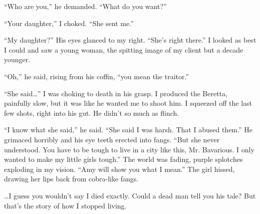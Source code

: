 ``Who are you,'' he demanded. ``What do you
want?''



``Your daughter,'' I choked. ``She sent
me.''



``My daughter?'' His eyes glanced to my right.
``She's right there.'' I looked as best I could and
saw a young woman, the spitting image of my client but a decade
younger.



``Oh,'' he said, rising from his coffin, ``you mean
the traitor.''



``She said{\ldots}'' I was choking to death in his grasp.
I produced the Beretta, painfully slow, but it was like he wanted
me to shoot him. I squeezed off the last few shots, right into his
gut. He didn't so much as flinch.



``I know what she said,'' he said. ``She said I was
harsh. That I abused them.'' He grimaced horribly and his eye
teeth erected into fangs. ``But she never understood. You have
to be tough to live in a city like this, Mr. Bavarious. I only
wanted to make my little girls tough.'' The world was fading,
purple splotches exploding in my vision. ``Amy will show you
what I mean.'' The girl hissed, drawing her lips back from
cobra-like fangs.



{\ldots}I guess you wouldn't say I died exactly. Could a dead
man tell you his tale? But that's the story of how I stopped
living. 
 



